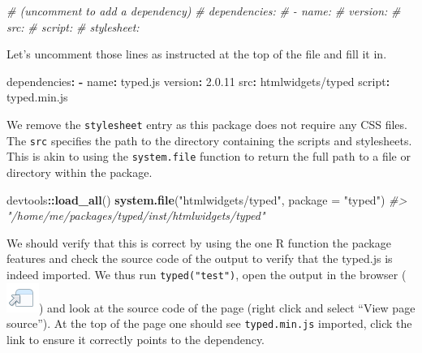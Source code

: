 \documentclass[
]{krantz}
\makeatletter
\newenvironment{Shaded}{\begin{snugshade}}{\end{snugshade}}
\newcommand{\AttributeTok}[1]{\textcolor[rgb]{0.61,0.61,0.61}{#1}}
\newcommand{\CommentTok}[1]{\textcolor[rgb]{0.37,0.37,0.37}{\textit{#1}}}
\newcommand{\DataTypeTok}[1]{\textcolor[rgb]{0.27,0.27,0.27}{#1}}
\newcommand{\FloatTok}[1]{\textcolor[rgb]{0.06,0.06,0.06}{#1}}
\newcommand{\FunctionTok}[1]{\textcolor[rgb]{0,0,0}{#1}}
\newcommand{\KeywordTok}[1]{\textcolor[rgb]{0.27,0.27,0.27}{\textbf{#1}}}
\newcommand{\NormalTok}[1]{#1}
\newcommand{\OperatorTok}[1]{\textcolor[rgb]{0.43,0.43,0.43}{\textbf{#1}}}
\newcommand{\StringTok}[1]{\textcolor[rgb]{0.5,0.5,0.5}{#1}}
\newenvironment{kframe}{%
\medskip{}
\setlength{\fboxsep}{.8em}
 \def\at@end@of@kframe{}%
 \ifinner\ifhmode%
  \def\at@end@of@kframe{\end{minipage}}%
  \begin{minipage}{\columnwidth}%
 \fi\fi%
 \def\FrameCommand##1{\hskip\@totalleftmargin \hskip-\fboxsep
 \colorbox{shadecolor}{##1}\hskip-\fboxsep
     \hskip-\linewidth \hskip-\@totalleftmargin \hskip\columnwidth}%
 \MakeFramed {\advance\hsize-\width
   \@totalleftmargin\z@ \linewidth\hsize
   \@setminipage}}%
 {\par\unskip\endMakeFramed%
 \at@end@of@kframe}
\renewenvironment{Shaded}{\begin{kframe}}{\end{kframe}}
\makeatother
\begin{document}
\begin{Shaded}
\begin{Highlighting}[]
\CommentTok{\# (uncomment to add a dependency)}
\CommentTok{\# dependencies:}
\CommentTok{\#  {-} name:}
\CommentTok{\#    version:}
\CommentTok{\#    src:}
\CommentTok{\#    script:}
\CommentTok{\#    stylesheet:}
\end{Highlighting}
\end{Shaded}

Let's uncomment those lines as instructed at the top of the file and fill it in.

\begin{Shaded}
\begin{Highlighting}[]
\FunctionTok{dependencies}\KeywordTok{:}
\AttributeTok{  }\KeywordTok{{-}}\AttributeTok{ }\FunctionTok{name}\KeywordTok{:}\AttributeTok{ typed.js}
\AttributeTok{    }\FunctionTok{version}\KeywordTok{:}\AttributeTok{ }\FloatTok{2.0.11}
\AttributeTok{    }\FunctionTok{src}\KeywordTok{:}\AttributeTok{ htmlwidgets/typed}
\AttributeTok{    }\FunctionTok{script}\KeywordTok{:}\AttributeTok{ typed.min.js}
\end{Highlighting}
\end{Shaded}

We remove the \texttt{stylesheet} entry as this package does not require any CSS files. The \texttt{src} specifies the path to the directory containing the scripts and stylesheets. This is akin to using the \texttt{system.file} function to return the full path to a file or directory within the package.

\begin{Shaded}
\begin{Highlighting}[]
\NormalTok{devtools}\OperatorTok{::}\KeywordTok{load\_all}\NormalTok{()}
\KeywordTok{system.file}\NormalTok{(}\StringTok{"htmlwidgets/typed"}\NormalTok{, }\DataTypeTok{package =} \StringTok{"typed"}\NormalTok{)                                         }
\CommentTok{\#> "/home/me/packages/typed/inst/htmlwidgets/typed"}
\end{Highlighting}
\end{Shaded}

We should verify that this is correct by using the one R function the package features and check the source code of the output to verify that the typed.js is indeed imported. We thus run \texttt{typed("test")}, open the output in the browser (\includegraphics{images/open-in-browser.png}) and look at the source code of the page (right click and select ``View page source''). At the top of the page one should see \texttt{typed.min.js} imported, click the link to ensure it correctly points to the dependency.
\end{document}
